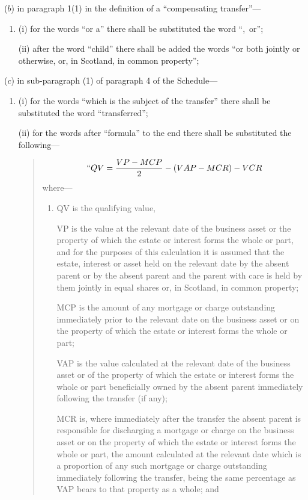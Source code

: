\documentclass[12pt,a4paper]{article}
\begin{document}
\begin{enumerate}
($b$) in paragraph 1(1) in the definition of a “compensating transfer”—
\begin{enumerate}\item[]
(i) for the words “or a” there shall be substituted the word “,~or”;

(ii) after the word “child” there shall be added the words “or both jointly or otherwise, or, in Scotland, in common property”;
\end{enumerate}

($c$) in sub-paragraph (1) of paragraph 4 of the Schedule—
\begin{enumerate}\item[]
(i) for the words “which is the subject of the transfer” there shall be substituted the word “transferred”;

(ii) for the words after “formula” to the end there shall be substituted the following—
\begin{quotation}
\[``QV = \frac{VP-MCP}{2} - (VAP-MCR) - VCR\]
where—
\begin{enumerate}\item[]
QV is the qualifying value,

VP is the value at the relevant date of the business asset or the property of which the estate or interest forms the whole or part,
and
for the purposes of this calculation it is assumed that the estate, interest or asset held on the relevant date by the absent parent or by the absent parent and the parent with care is held by them jointly in equal shares or, in Scotland, in common property;

MCP is the amount of any mortgage or charge outstanding immediately prior to the relevant date on the business asset or on the property of which the estate or interest forms the whole or part;

VAP is the value calculated at the relevant date of the business asset or of the property of which the estate or interest forms the whole or part beneficially owned by the absent parent immediately following the transfer (if any);

MCR is, where immediately after the transfer the absent parent is responsible for discharging a mortgage or charge on the business asset or on the property of which the estate or interest forms the whole or part, the amount calculated at the relevant date which is a proportion of any such mortgage or charge outstanding immediately following the transfer, being the same percentage as VAP bears to that property as a whole; and


\end{enumerate}
\end{quotation}
\end{enumerate}
\end{enumerate}
\end{document}
